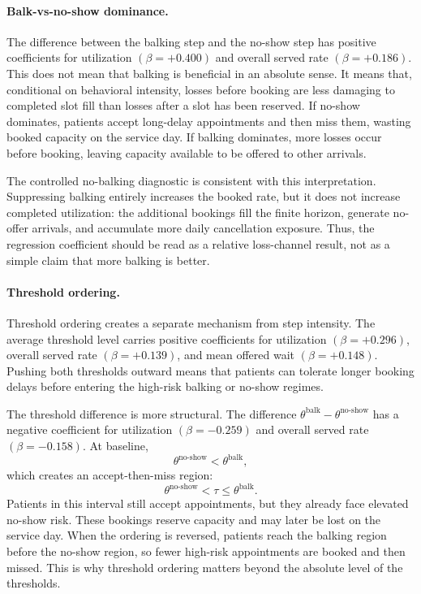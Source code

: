 \documentclass[11pt]{article}
\begin{document}
\paragraph{Balk-vs-no-show dominance.}
The difference between the balking step and the no-show step has positive
coefficients for utilization \((\beta=+0.400)\) and overall served rate
\((\beta=+0.186)\). This does not mean that balking is beneficial in an
absolute sense. It means that, conditional on behavioral intensity, losses
before booking are less damaging to completed slot fill than losses after a
slot has been reserved. If no-show dominates, patients accept long-delay
appointments and then miss them, wasting booked capacity on the service day.
If balking dominates, more losses occur before booking, leaving capacity
available to be offered to other arrivals.

The controlled no-balking diagnostic is consistent with this interpretation.
Suppressing balking entirely increases the booked rate, but it does not
increase completed utilization: the additional bookings fill the finite
horizon, generate no-offer arrivals, and accumulate more daily cancellation
exposure. Thus, the regression coefficient should be read as a relative
loss-channel result, not as a simple claim that more balking is better.

\paragraph{Threshold ordering.}
Threshold ordering creates a separate mechanism from step intensity. The
average threshold level carries positive coefficients for utilization
\((\beta=+0.296)\), overall served rate \((\beta=+0.139)\), and mean offered
wait \((\beta=+0.148)\). Pushing both thresholds outward means that patients
can tolerate longer booking delays before entering the high-risk balking or
no-show regimes.

The threshold difference is more structural. The difference
\(\theta^{\text{balk}}-\theta^{\text{no-show}}\) has a negative coefficient
for utilization \((\beta=-0.259)\) and overall served rate \((\beta=-0.158)\).
At baseline,
\[
\theta^{\text{no-show}} < \theta^{\text{balk}},
\]
which creates an accept-then-miss region:
\[
\theta^{\text{no-show}} < \tau \leq \theta^{\text{balk}}.
\]
Patients in this interval still accept appointments, but they already face
elevated no-show risk. These bookings reserve capacity and may later be lost
on the service day. When the ordering is reversed, patients reach the balking
region before the no-show region, so fewer high-risk appointments are booked
and then missed. This is why threshold ordering matters beyond the absolute
level of the thresholds.
\end{document}
